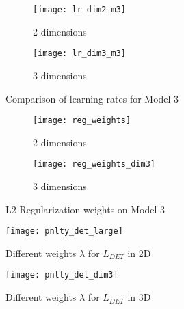
\label{appendix}

\begin{figure}
	\centering
	\begin{subfigure}{.5\textwidth}
		\centering
		\texttt{[image: lr\_dim2\_m3]}
		\caption{2 dimensions}
	\end{subfigure}%
	\begin{subfigure}{.5\textwidth}
		\centering
		\texttt{[image: lr\_dim3\_m3]}
		\caption{3 dimensions}
	\end{subfigure}
	\caption{Comparison of learning rates for Model 3}
	\label{fig:comp_lr_m3}
\end{figure}

\begin{figure}
	\centering
	\begin{subfigure}{.5\textwidth}
		\centering
		\texttt{[image: reg\_weights]}
		\caption{2 dimensions}
	\end{subfigure}%
	\begin{subfigure}{.5\textwidth}
		\centering
		\texttt{[image: reg\_weights\_dim3]}
		\caption{3 dimensions}
	\end{subfigure}
	\caption{L2-Regularization weights on Model 3}
	\label{fig:reg_weights}
\end{figure}


\begin{figure}[ht]
	\centering
	\texttt{[image: pnlty\_det\_large]}
	\caption{Different weights $\lambda$ for $L_{DET}$ in 2D}
	\label{fig:pnlty_det_large}
\end{figure}

\begin{figure}[ht]
	\centering
	\texttt{[image: pnlty\_det\_dim3]}
	\caption{Different weights $\lambda$ for $L_{DET}$ in 3D}
	\label{fig:pnlty_det_dim3}
\end{figure}



\clearpage
